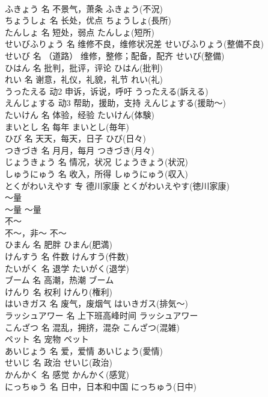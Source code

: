 \documentclass[8pt]{extreport}
\begin{document}
\begin{CJK}{UTF8}{min}
\\	ふきょう	名	不景气，萧条	ふきょう(不況)	
\\	ちょうしょ	名	长处，优点	ちょうしょ(長所)	
\\	たんしょ	名	短处，弱点	たんしょ(短所)	
\\	せいびふりょう	名	维修不良，维修状况差	せいびふりょう(整備不良)	
\\	せいび	名	（道路） 维修，整修；配备，配齐	せいび(整備)	
\\	ひはん	名	批判，批评，评论	ひはん(批判)	
\\	れい	名	谢意，礼仪，礼貌，礼节	れい(礼)	
\\	うったえる	动2	申诉，诉说，呼吁	うったえる(訴える)	
\\	えんじょする	动3	帮助，援助，支持	えんじょする(援助～)	
\\	たいけん	名	体验，经验	たいけん(体験)	
\\	まいとし	名	每年	まいとし(毎年)	
\\	ひび	名	天天，每天，日子	ひび(日々)	
\\	つきづき	名	月月，每月	つきづき(月々)	
\\	じょうきょう	名	情况，状况	じょうきょう(状況)	
\\	しゅうにゅう	名	收入，所得	しゅうにゅう(収入)	
\\	とくがわいえやす	专	德川家康	とくがわいえやす(徳川家康)	
\\	～量	
\\	～量	～量	
\\	不～	
\\	不～，非～	不～	
\\	ひまん	名	肥胖	ひまん(肥満)	
\\	けんすう	名	件数	けんすう(件数)	
\\	たいがく	名	退学	たいがく(退学)	
\\	ブーム	名	高潮，热潮	ブーム	
\\	けんり	名	权利	けんり(権利)	
\\	はいきガス	名	废气，废烟气	はいきガス(排気～)	
\\	ラッシュアワー	名	上下班高峰时间	ラッシュアワー	
\\	こんざつ	名	混乱，拥挤，混杂	こんざつ(混雑)	
\\	ペット	名	宠物	ペット	
\\	あいじょう	名	爱，爱情	あいじょう(愛情)	
\\	せいじ	名	政治	せいじ(政治)	
\\	かんかく	名	感觉	かんかく(感覚)	
\\	にっちゅう	名	日中，日本和中国	にっちゅう(日中)	

\end{CJK}
\end{document}
